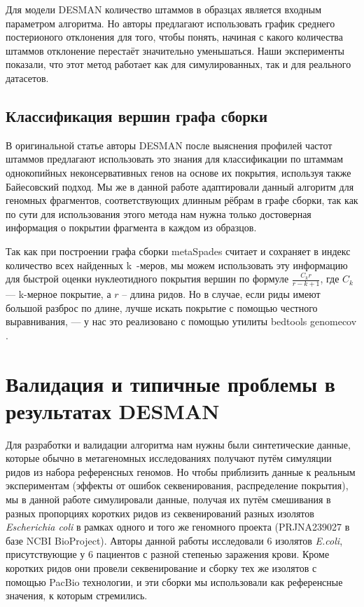 \documentclass{spbau-diploma}
\begin{document}
Для модели DESMAN количество штаммов в образцах является входным параметром алгоритма. Но авторы предлагают использовать график среднего постерионого отклонения для того, чтобы понять, начиная с какого количества штаммов отклонение перестаёт значительно уменьшаться. Наши эксперименты показали, что этот метод работает как для симулированных, так и для реального датасетов.

\subsection{Классификация вершин графа сборки}

В оригинальной статье авторы DESMAN после выяснения профилей частот штаммов предлагают использовать это знания для классификации по штаммам однокопийных неконсервативных генов на основе их покрытия, используя также Байесовский подход. Мы же в данной работе адаптировали данный алгоритм для геномных фрагментов, соответствующих длинным рёбрам в графе сборки, так как по сути для использования этого метода нам нужна только достоверная информация о покрытии фрагмента в каждом из образцов.

Так как при построении графа сборки metaSpades считает и сохраняет в индекс количество всех найденных k~-меров, мы можем использовать эту информацию для быстрой оценки нуклеотидного покрытия вершин по формуле $\frac{C_k r}{r - k + 1}$, где $C_k$ --- k-мерное покрытие, а $r$ -- длина ридов. Но в случае, если риды имеют большой разброс по длине, лучше искать покрытие с помощью честного выравнивания, --- у нас это реализовано с помощью утилиты bedtools genomecov \cite{bedtools}.


\section{Валидация и типичные проблемы в результатах DESMAN}

Для разработки и валидации алгоритма нам нужны были синтетические данные, которые обычно в метагеномных исследованиях получают путём симуляции ридов из набора референсных геномов. Но чтобы приблизить данные к реальным экспериментам (эффекты от ошибок секвенирования, распределение покрытия), мы в данной работе симулировали данные, получая их путём смешивания в разных пропорциях коротких ридов из секвенирований разных изолятов \textit{Escherichia coli} в рамках одного и того же геномного проекта (PRJNA239027 в базе NCBI BioProject). Авторы данной работы \cite{isolates} исследовали 6 изолятов \textit{E.coli}, присутствующие у 6 пациентов с разной степенью заражения крови. Кроме коротких ридов они провели секвенирование и сборку тех же изолятов с помощью PacBio технологии, и эти сборки мы использовали как референсные значения, к которым стремились. 
\end{document}
